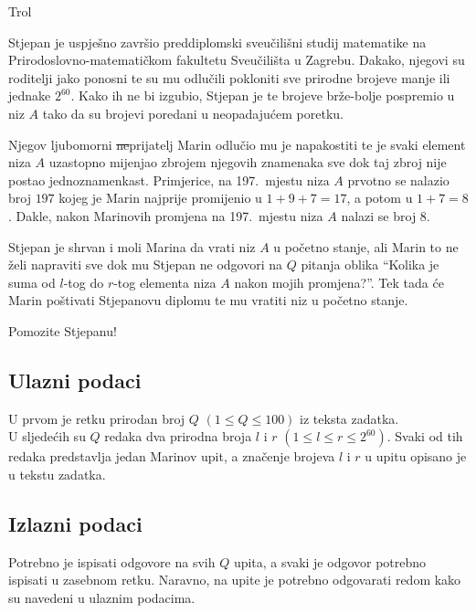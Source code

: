 \begin{statement}[
  problempoints=50,
  timelimit=1 sekunda,
  memorylimit=512 MiB,
]{Trol}

Stjepan je uspješno završio preddiplomski sveučilišni studij matematike na
Prirodoslovno-matematičkom fakultetu Sveučilišta u Zagrebu. Dakako, njegovi su
roditelji jako ponosni te su mu odlučili pokloniti sve prirodne brojeve manje
ili jednake $2^{60}$. Kako ih ne bi izgubio, Stjepan je te brojeve brže-bolje
pospremio u niz $A$ tako da su brojevi poredani u neopadajućem poretku.

Njegov ljubomorni \sout{ne}prijatelj Marin odlučio mu je napakostiti te je svaki
element niza $A$ uzastopno mijenjao zbrojem njegovih znamenaka sve dok taj zbroj
nije postao jednoznamenkast. Primjerice, na 197.\ mjestu niza $A$ prvotno se
nalazio broj $197$ kojeg je Marin najprije promijenio u $1+9+7=17$, a potom u
$1+7=8$. Dakle, nakon Marinovih promjena na 197.\ mjestu niza $A$ nalazi se broj
$8$.

Stjepan je shrvan i moli Marina da vrati niz $A$ u početno stanje, ali Marin to
ne želi napraviti sve dok mu Stjepan ne odgovori na $Q$ pitanja oblika
“Kolika je suma od $l$-tog do $r$-tog elementa niza $A$ nakon mojih promjena?”.
Tek tada će Marin poštivati Stjepanovu diplomu te mu vratiti niz u početno
stanje.

Pomozite Stjepanu!

\subsection*{Ulazni podaci}
U prvom je retku prirodan broj $Q$ $(1 \le Q \le 100)$ iz teksta zadatka. \\
U sljedećih su $Q$ redaka dva prirodna broja $l$ i $r$
$(1 \le l \le r \le 2^{60})$. Svaki od tih redaka predstavlja jedan Marinov
upit, a značenje brojeva $l$ i $r$ u upitu opisano je u tekstu zadatka.

\subsection*{Izlazni podaci}
Potrebno je ispisati odgovore na svih $Q$ upita, a svaki je odgovor potrebno
ispisati u zasebnom retku. Naravno, na upite je potrebno odgovarati redom kako
su navedeni u ulaznim podacima.


\end{statement}
